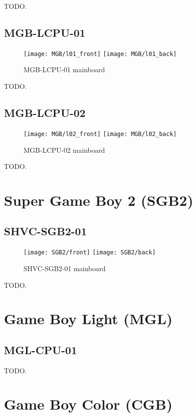 TODO.

\subsection{MGB-LCPU-01}

\begin{figure}[H]
  \centering
  \texttt{[image: MGB/l01\_front]}
  \texttt{[image: MGB/l01\_back]}
  \caption{MGB-LCPU-01 mainboard}
\end{figure}

TODO.

\subsection{MGB-LCPU-02}

\begin{figure}[H]
  \centering
  \texttt{[image: MGB/l02\_front]}
  \texttt{[image: MGB/l02\_back]}
  \caption{MGB-LCPU-02 mainboard}
\end{figure}

TODO.

\section{Super Game Boy 2 (SGB2)}

\subsection{SHVC-SGB2-01}

\begin{figure}[H]
  \centering
  \texttt{[image: SGB2/front]}
  \texttt{[image: SGB2/back]}
  \caption{SHVC-SGB2-01 mainboard}
\end{figure}

TODO.

\section{Game Boy Light (MGL)}

\subsection{MGL-CPU-01}

TODO.

\section{Game Boy Color (CGB)}

